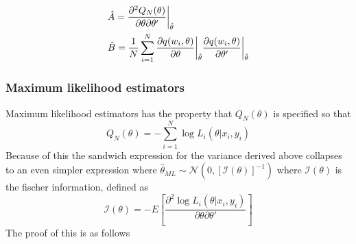 \begin{align*}
&\hat{A} = \frac{\partial^2 Q_N(\theta)}{\partial \theta \partial \theta'} \bigg{|}_{\hat{\theta}}
\\
& \hat{B} = \frac{1}{N} \sum_{i=1}^N \frac{\partial q(w_i, \theta)}{\partial \theta} \bigg{|}_{\hat{\theta}} \frac{\partial q(w_i, \theta)}{\partial \theta'} \bigg{|}_{\hat{\theta}}
\end{align*}

\subsubsection{Maximum likelihood estimators}
Maximum likelihood estimators has the property that $Q_N(\theta)$ is specified so that
\begin{equation}
Q_N(\theta) = - \sum_{i=1}^N \log L_i(\theta| x_i,y_i)
\end{equation}
Because of this the sandwich expression for the variance derived above collapses to an even simpler expression where $\hat{\theta}_{ML} \sim \mathcal{N}(0, [\mathcal{I}(\theta)]^{-1})$ where $\mathcal{I}(\theta)$ is the fischer information, defined as
\begin{equation}
\mathcal{I}(\theta) = -E\left[ \frac{\partial^2 \log L_i(\theta| x_i,y_i)}{\partial \theta \partial \theta'} \right]
\end{equation}
The proof of this is as follows

